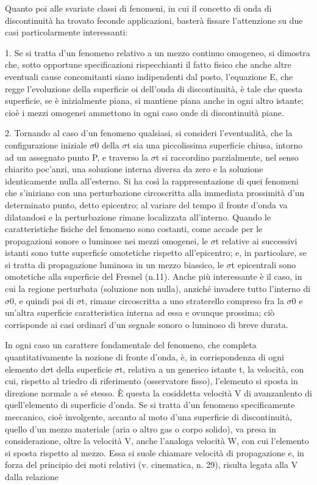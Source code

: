 \documentclass[a4paper]{article}
\begin{document}
Quanto poi alle svariate classi di fenomeni, in cui il concetto di onda di discontinuità ha trovato feconde applicazioni, basterà fissare l'attenzione su due casi particolarmente interessanti:

1. Se si tratta d'un fenomeno relativo a un mezzo continuo omogeneo, si dimostra che, sotto opportune specificazioni rispecchianti il fatto fisico che anche altre eventuali cause concomitanti siano indipendenti dal posto, l'equazione E, che regge l'evoluzione della superficie oi dell'onda di discontinuità, è tale che questa superficie, se è inizialmente piana, si mantiene piana anche in ogni altro istante; cioè i mezzi omogenei ammettono in ogni caso onde di discontinuità piane.

2. Tornando al caso d'un fenomeno qualsiasi, si consideri l'eventualità, che la configurazione iniziale $\sigma$0 della $\sigma$t sia una piccolissima superficie chiusa, intorno ad un assegnato punto P, e traverso la $\sigma$t si raccordino parzialmente, nel senso chiarito poc'anzi, una soluzione interna diversa da zero e la soluzione identicamente nulla all'esterno. Si ha così la rappresentazione di quei fenomeni che s'iniziano con una perturbazione circoscritta alla immediata prossimità d'un determinato punto, detto epicentro; al variare del tempo il fronte d'onda va dilatandosi e la perturbazione rimane localizzata all'interno. Quando le caratteristiche fisiche del fenomeno sono costanti, come accade per le propagazioni sonore o luminose nei mezzi omogenei, le $\sigma$t relative ai successivi istanti sono tutte superficíe omotetiche rispetto all'epicentro; e, in particolare, se si tratta di propagazione luminosa in un mezzo biassico, le $\sigma$t epicentrali sono omotetiche alla superficie del Fresnel (n.11). Anche più interessante è il caso, in cui la regione perturbata (soluzione non nulla), anziché invadere tutto l'interno di $\sigma$0, e quindi poi di $\sigma$t, rimane circoscritta a uno straterello compreso fra la $\sigma$0 e un'altra superficie caratteristica interna ad essa e ovunque prossima; ciò corrisponde ai casi ordinarî d'un segnale sonoro o luminoso di breve durata.

In ogni caso un carattere fondamentale del fenomeno, che completa quantitativamente la nozione di fronte d'onda, è, in corrispondenza di ogni elemento d$\sigma$t della superficie $\sigma$t, relativa a un generico istante t, la velocità, con cui, rispetto al triedro di riferimento (osservatore fisso), l'elemento si sposta in direzione normale a sé stesso. È questa la cosiddetta velocità V di avanzanlento di quell'elemento di superficie d'onda. Se si tratta d'un fenomeno specificamente meccanico, cioè involgente, accanto al moto d'una superficie di discontinuità, quello d'un mezzo materiale (aria o altro gas o corpo solido), va presa in considerazione, oltre la velocità V, anche l'analoga velocità W, con cui l'elemento si sposta rispetto al mezzo. Essa si suole chiamare velocità di propagazione e, in forza del principio dei moti relativi (v. cinematica, n. 29), risulta legata alla V dalla relazione
\end{document}
